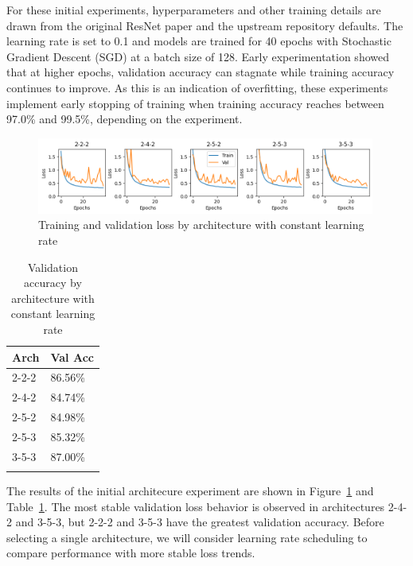 \documentclass[letterpaper]{article} %
\begin{document}
For these initial experiments, hyperparameters and other training details are drawn from the original ResNet paper and
the upstream repository defaults.
The learning rate is set to 0.1 and models are trained for 40 epochs with Stochastic Gradient Descent (SGD) at a batch
size of 128.
Early experimentation showed that at higher epochs, validation accuracy can stagnate while training accuracy continues
to improve.
As this is an indication of overfitting, these experiments implement early stopping of training when
training accuracy reaches between 97.0\% and 99.5\%, depending on the experiment.

\begin{figure}[t]
\centering
\includegraphics[width=0.99\textwidth]{loss-curves-5} %
\caption{Training and validation loss by architecture with constant learning rate}
\label{fig2}
\end{figure}

\begin{table}[t]
\centering
\begin{tabular}{|l|l|}
    \firsthline
    Arch & Val Acc    \\
    \hline
    2-2-2 & 86.56\%    \\
    2-4-2 & 84.74\%    \\
    2-5-2 & 84.98\%    \\
    2-5-3 & 85.32\%    \\
    3-5-3 & 87.00\%    \\
    \lasthline
\end{tabular}
\caption{Validation accuracy by architecture with constant learning rate}
\label{table1}
\end{table}

The results of the initial architecure experiment are shown in Figure~\ref{fig2} and Table~\ref{table1}.
The most stable validation loss behavior is observed in architectures 2-4-2 and 3-5-3, but 2-2-2 and 3-5-3
have the greatest validation accuracy.
Before selecting a single architecture, we will consider learning rate scheduling to compare performance
with more stable loss trends.
\end{document}
